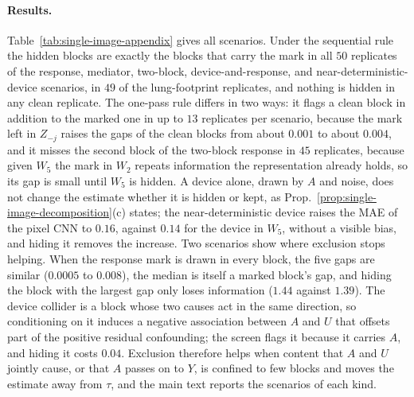 \paragraph{Results.} Table~\ref{tab:single-image-appendix} gives all scenarios. Under the sequential rule the hidden blocks are exactly the blocks that carry the mark in all $50$ replicates of the response, mediator, two-block, device-and-response, and near-deterministic-device scenarios, in $49$ of the lung-footprint replicates, and nothing is hidden in any clean replicate. The one-pass rule differs in two ways: it flags a clean block in addition to the marked one in up to $13$ replicates per scenario, because the mark left in $Z_{-j}$ raises the gaps of the clean blocks from about $0.001$ to about $0.004$, and it misses the second block of the two-block response in $45$ replicates, because given $W_5$ the mark in $W_2$ repeats information the representation already holds, so its gap is small until $W_5$ is hidden. A device alone, drawn by $A$ and noise, does not change the estimate whether it is hidden or kept, as Prop.~\ref{prop:single-image-decomposition}(c) states; the near-deterministic device raises the MAE of the pixel CNN to $0.16$, against $0.14$ for the device in $W_5$, without a visible bias, and hiding it removes the increase. Two scenarios show where exclusion stops helping. When the response mark is drawn in every block, the five gaps are similar ($0.0005$ to $0.008$), the median is itself a marked block's gap, and hiding the block with the largest gap only loses information ($1.44$ against $1.39$). The device collider is a block whose two causes act in the same direction, so conditioning on it induces a negative association between $A$ and $U$ that offsets part of the positive residual confounding; the screen flags it because it carries $A$, and hiding it costs $0.04$. Exclusion therefore helps when content that $A$ and $U$ jointly cause, or that $A$ passes on to $Y$, is confined to few blocks and moves the estimate away from $\tau$, and the main text reports the scenarios of each kind.

